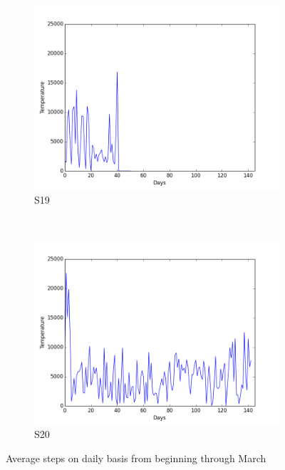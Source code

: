 \documentclass[12pt]{article} %
\begin{document}
\begin{figure}[H]
    \begin{subfigure}[b]{0.2\textwidth}
        \includegraphics[width=\textwidth]{img/graphs/19-steps-1}
        \caption{S19}
        \label{fig:s19Step}
    \end{subfigure}
    ~ %
    \begin{subfigure}[b]{0.2\textwidth}
        \includegraphics[width=\textwidth]{img/graphs/20-steps-1}
        \caption{S20}
        \label{fig:s20Step}
    \end{subfigure}
    \caption{Average steps on daily basis from beginning through March}
    \label{fig:avgsteps1}
\end{figure}
\end{document}
